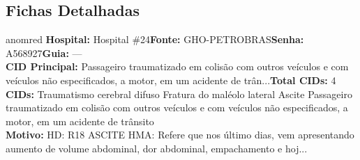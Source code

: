 \documentclass[a4paper,10pt]{article}
\begin{document}
\subsection{Fichas Detalhadas}
\begin{anomalycard}[Interna\c{c}\~{a}o \#167601 | Pac. \#21775 | CR\'{I}TICO (z=5.79) | LOS: 20d | 03/03/2026\,$\to$\,—]{anomred}
\textbf{Hospital:} Hospital \#24\quad \textbf{Fonte:} GHO-PETROBRAS\quad \textbf{Senha:} A568927\quad \textbf{Guia:} ---\\

\textbf{CID Principal:} {\small Passageiro traumatizado em colisão com outros veículos e com veículos não especificados, a motor, em um acidente de trân...}\quad\textbf{Total CIDs:} 4\\

\textbf{CIDs:} {\scriptsize Traumatismo cerebral difuso \textbar{} Fratura do maléolo lateral \textbar{} Ascite \textbar{} Passageiro traumatizado em colisão com outros veículos e com veículos não especificados, a motor, em um acidente de trânsito}\\

\textbf{Motivo:} {\scriptsize HD: R18   ASCITE HMA: Refere que nos último dias, vem apresentando aumento de volume abdominal, dor abdominal, empachamento e hoj...}\\




\end{anomalycard}
\end{document}
